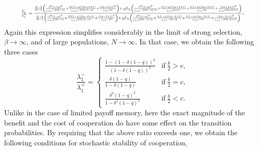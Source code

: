 \documentclass[11pt]{article}
\theoremstyle{plainCl1}
\theoremstyle{plainCl2}
\begin{document}
\begin{equation}
  \resizebox{.9\textwidth}{!}
  {%
$\frac{\lambda^{-}_1}{\lambda^{+}_1} =
\frac{\frac{N - 3}{N-1} \left(\frac{\delta^{2} \left(1-q\right)^{2}}{1 + e^{- \beta \left(b - c\right)}} + \frac{2 \delta \left(1 - q\right) \left(\delta q - \delta + 1\right)}{1 + e^{- \beta \left(b/2 - c\right)}} + \frac{\left(\delta q - \delta + 1\right)^{2}}{1+e^{\beta c}}\right) + \frac{2}{N-1} \left(\frac{\delta^{2} \left(1-q\right)^{2}}{1 + e^{- \beta \left(b - c\right)/2}} + \frac{\delta \left(1 - q\right) \left(\delta q - \delta + 1\right)}{1+e^{\beta c/2} } + \frac{\delta \left(1 - q\right) \left(\delta q - \delta + 1\right)}{1+e^{\beta c} } + \frac{\left(\delta q - \delta + 1\right)^{2}}{1 + e^{ \beta \left( b/2 + c\right)}}\right)}
{\frac{N - 3}{N-1} \left(\frac{\delta^{2} \left(1 - q\right)^{2}}{1 + e^{\beta \left( b - c\right)}} + \frac{2 \delta \left(1 - q\right) \left(\delta q - \delta + 1\right)}{1 + e^{ \beta \left(b/2 - c\right)}} + \frac{\left(\delta q - \delta + 1\right)^{2}}{1 + e^{- \beta c}}\right) 
+ \frac{2}{N-1} \left(\frac{\delta^{2} \left(1 - q\right)^{2}}{1 + e^{ \beta \left(b-c\right)/2}} + \frac{\delta \left(1 - q\right) \left(\delta q - \delta + 1\right)}{1 + e^{- \beta c/2}} + \frac{\delta \left(1 - q\right) \left(\delta q - \delta + 1\right)}{1 + e^{- \beta c}} + \frac{\left(\delta q - \delta + 1\right)^{2}}{1 + e^{- \beta \left(b/2 + c\right)}}\right)}
$} .
\end{equation}
Again this expression simplifies considerably in the limit of strong selection, \(\beta \rightarrow \infty\), and of large
populations, \(N \rightarrow \infty \). In that case, we obtain the following three cases
\begin{equation} \label{Eq:RatioTransitionTwoInteraction}
\frac{\lambda^{-}_1}{\lambda^{+}_1} = 
\begin{cases}
 \frac{1-(1-\delta(1-q))^2}{(1-\delta(1-q))^2} &\text{if}~ \frac{b}{2} > c , \\[0.2cm]
  \frac{\delta(1-q)}{1-\delta(1-q)}  &\text{if}~ \frac{b}{2} = c , \\[0.2cm]
  \frac{\delta^2(1-q)^2}{1-\delta^2(1-q)^2} &\text{if}~\frac{b}{2} < c .
\end{cases}
\end{equation}
Unlike in the case of limited payoff memory, here the exact magnitude of the benefit and the cost of cooperation do have some effect on the transition probabilities. 
By requiring that the above ratio exceeds one, we obtain the following conditions for stochastic stability of cooperation, 
\end{document}
